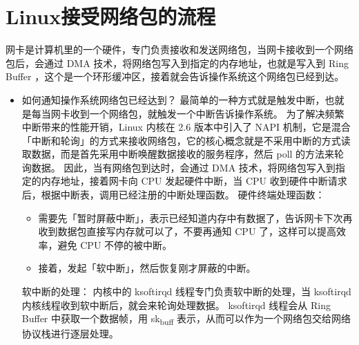 \documentclass[11pt]{article}
\begin{document}
\section{Linux接受网络包的流程}
\label{sec:org76e686f}

网卡是计算机里的一个硬件，专门负责接收和发送网络包，当网卡接收到一个网络包后，会通过 DMA 技术，将网络包写入到指定的内存地址，也就是写入到 Ring Buffer ，这个是一个环形缓冲区，接着就会告诉操作系统这个网络包已经到达。

\begin{itemize}
\item 如何通知操作系统网络包已经达到？
最简单的一种方式就是触发中断，也就是每当网卡收到一个网络包，就触发一个中断告诉操作系统。
为了解决频繁中断带来的性能开销，Linux 内核在 2.6 版本中引入了 NAPI 机制，它是混合「中断和轮询」的方式来接收网络包，它的核心概念就是不采用中断的方式读取数据，而是首先采用中断唤醒数据接收的服务程序，然后 poll 的方法来轮询数据。
因此，当有网络包到达时，会通过 DMA 技术，将网络包写入到指定的内存地址，接着网卡向 CPU 发起硬件中断，当 CPU 收到硬件中断请求后，根据中断表，调用已经注册的中断处理函数。
硬件终端处理函数：
\begin{itemize}
\item 需要先「暂时屏蔽中断」，表示已经知道内存中有数据了，告诉网卡下次再收到数据包直接写内存就可以了，不要再通知 CPU 了，这样可以提高效率，避免 CPU 不停的被中断。
\item 接着，发起「软中断」，然后恢复刚才屏蔽的中断。
\end{itemize}
软中断的处理：
内核中的 ksoftirqd 线程专门负责软中断的处理，当 ksoftirqd 内核线程收到软中断后，就会来轮询处理数据。
ksoftirqd 线程会从 Ring Buffer 中获取一个数据帧，用 sk\textsubscript{buff} 表示，从而可以作为一个网络包交给网络协议栈进行逐层处理。
\end{itemize}
\end{document}
